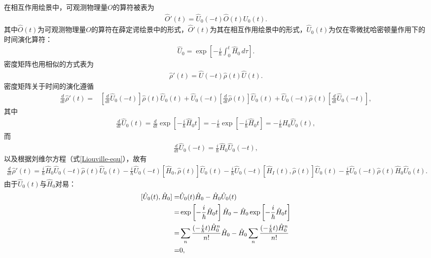 \documentclass{assignment}
\begin{document}
在相互作用绘景中，可观测物理量$O$的算符被表为
\begin{align}
    \hat{O}'(t)=\hat{U}_0(-t)\hat{O}(t)\hat{U}_0(t).
\end{align}
其中$\hat{O}(t)$为可观测物理量$O$的算符在薛定谔绘景中的形式，$\hat{O}'(t)$为其在相互作用绘景中的形式，$\hat{U}_0(t)$为仅在零微扰哈密顿量作用下的时间演化算符：
\begin{align}
    \hat{U}_0=\exp\left[-\frac{i}{\hbar}\int_0^t\hat{H}_0\,d\tau\right].
\end{align}
密度矩阵也用相似的方式表为
\begin{align}
    \hat{\rho}'(t)=\hat{U}(-t)\hat{\rho}(t)\hat{U}(t).
\end{align}
密度矩阵关于时间的演化遵循
\begin{align}
    \frac{d}{dt}\hat{\rho}'(t)=&\left[\frac{d}{dt}\hat{U}_0(-t)\right]\hat{\rho}(t)\hat{U}_0(t)+\hat{U}_0(-t)\left[\frac{d}{dt}\hat{\rho}(t)\right]\hat{U}_0(t)+\hat{U}_0(-t)\hat{\rho}(t)\left[\frac{d}{dt}\hat{U}_0(-t)\right],
\end{align}
其中
\begin{align}
    \frac{d}{dt}\hat{U}_0(t)=\frac{d}{dt}\exp\left[-\frac{i}{\hbar}\hat{H}_0t\right]=-\frac{i}{\hbar}\exp\left[-\frac{i}{\hbar}\hat{H}_0t\right]=-\frac{i}{\hbar}\hat{H}_0\hat{U}_0(t),
\end{align}
而
\begin{align}
    \frac{d}{dt}\hat{U}_0(-t)=\frac{i}{\hbar}\hat{H}_0\hat{U}_0(-t),
\end{align}
以及根据刘维尔方程（式\eqref{Liouville-equ}），故有
\begin{align}
    \label{density-matrix-evolution-2}
    \frac{d}{dt}\hat{\rho}'(t)=\frac{i}{\hbar}\hat{H}_0\hat{U}_0(-t)\hat{\rho}(t)\hat{U}_0(t)-\frac{i}{\hbar}\hat{U}_0(-t)[\hat{H}_0,\hat{\rho}(t)]\hat{U}_0(t)-\frac{i}{\hbar}\hat{U}_0(-t)[\hat{H}_I(t),\hat{\rho}(t)]\hat{U}_0(t)-\frac{i}{\hbar}\hat{U}_0(-t)\hat{\rho}(t)\hat{H}_0\hat{U}_0(t).
\end{align}
由于$\hat{U}_0(t)$与$\hat{H}_0$对易：
\begin{align}
    \notag[\hat{U}_0(t),\hat{H}_0]=&\hat{U}_0(t)\hat{H}_0-\hat{H}_0\hat{U}_0(t)\\
    \notag=&\exp\left[-\frac{i}{\hbar}\hat{H}_0t\right]\hat{H}_0-\hat{H}_0\exp\left[-\frac{i}{\hbar}\hat{H}_0t\right]\\
    \notag=&\sum_n\frac{(-\frac{i}{\hbar}t)\hat{H}_0^n}{n!}\hat{H}_0-\hat{H}_0\sum_n\frac{(-\frac{i}{\hbar}t)\hat{H}_0^n}{n!}\\
    =&0,
\end{align}
\end{document}
